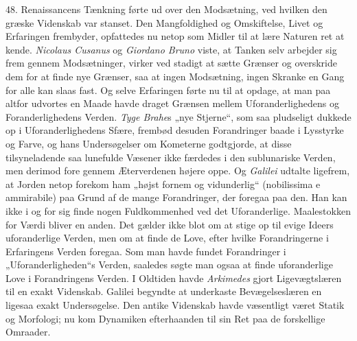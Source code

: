 \documentclass[12pt,a4paper]{book}
\newcommand{\apage}[1]{\marginnote{\footnotesize\textit{[#1]}}}
\begin{document}
48. Renaissancens Tænkning førte ud over den Modsætning, ved hvilken den
græske Videnskab var stanset. Den Mangfoldighed og Omskiftelse, Livet og
Erfaringen frembyder, opfattedes nu netop som Midler til at lære Naturen
ret at kende. \emph{Nicolaus Cusanus} og \emph{Giordano Bruno} viste, at
Tanken selv arbejder sig frem gennem Modsætninger, virker ved stadigt at
sætte Grænser og overskride dem for at finde nye Grænser, saa at ingen
Modsætning, ingen Skranke en Gang for alle kan slaas fast. Og selve
Erfaringen førte nu til at opdage, at man paa altfor udvortes en Maade
havde draget Grænsen mellem Uforanderlighedens og Foranderlighedens
Verden. \emph{Tyge Brahe}s „nye Stjerne“, som saa pludseligt dukkede op
i Uforanderlighedens Sfære, \apage{128} frembød desuden Forandringer baade i
Lysstyrke og Farve, og hans Undersøgelser om Kometerne godtgjorde, at
disse tilsyneladende saa lunefulde Væsener ikke færdedes i den
sublunariske Verden, men derimod fore gennem Æterverdenen højere oppe.
Og \emph{Galilei} udtalte ligefrem, at Jorden netop forekom ham „højst fornem og
vidunderlig“ (nobilissima e ammirabile) paa Grund af de mange
Forandringer, der foregaa paa den. Han kan ikke i og for sig finde nogen
Fuldkommenhed ved det Uforanderlige. Maalestokken for Værdi bliver en
anden. Det gælder ikke blot om at stige op til evige Ideers uforanderlige
Verden, men om at finde de Love, efter hvilke Forandringerne i
Erfaringens Verden foregaa. Som man havde fundet Forandringer i
„Uforanderligheden“s Verden, saaledes søgte man ogsaa at finde
uforanderlige Love i Forandringens Verden. I Oldtiden havde
\emph{Arkimedes} gjort Ligevægtslæren til en exakt Videnskab. Galilei
begyndte at underkaste Bevægelseslæren en ligesaa exakt Undersøgelse. Den
antike Videnskab havde væsentligt været Statik og Morfologi; nu kom
Dynamiken efterhaanden til sin Ret paa de forskellige Omraader.
\end{document}
